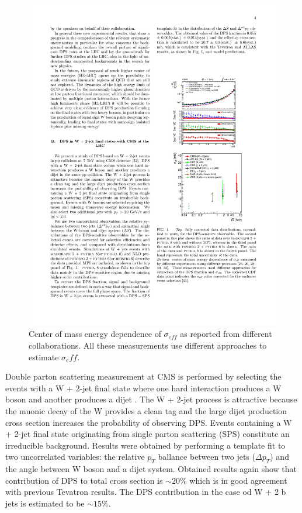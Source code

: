 \begin{figure}[htbp]
	\centering
		\includegraphics{Figures/DPS_res.pdf}
	\caption[Results of $\sigma_{eff}$ measurements]{Center of mass energy dependence of $\sigma_{eff}$ as reported from different collaborations. All these measurements use different approaches to estimate $\sigma_eff$. \cite{Bansal:2014paa}}
	\label{fig:DPS_res}
\end{figure}
\par Double parton scattering measurement at CMS is performed by selecting the events with a W + 2-jet final state where one hard interaction produces a W boson and another produces a dijet \cite{Chatrchyan:2013xxa}. The W + 2-jet process is attractive because the muonic decay of the W provides a clean tag and the large dijet production cross section increases the probability of observing DPS. Events containing a W + 2-jet final state originating from single parton scattering (SPS) constitute an irreducible background. Results were obtained by performing a template fit to two uncorrelated variables: the relative $p_T$ ballance between two jets ($\Delta p_T$) and the angle between W boson and a dijet system. Obtained results again show that contribution of DPS to total cross section is $\sim 20\%$ which is in good agreement with previous Tevatron results. The DPS contribution in the case od W + 2 b jets is estimated to be $\sim 15\%$. \cite{Chatrchyan:2013uza}

